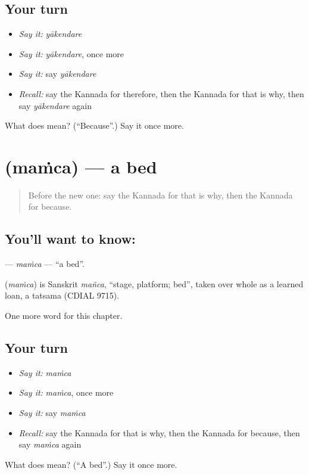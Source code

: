 \subsection*{Your turn}
\begin{itemize}
\raggedright
  \item \emph{Say it:} \emph{yākendare}
  \item \emph{Say it:} \emph{yākendare}, once more
  \item \emph{Say it:} say \emph{yākendare}
  \item \emph{Recall:} say the Kannada for therefore, then the Kannada for that is why, then say \emph{yākendare} again
\end{itemize}

\begin{tcolorbox}[breakable,colback=teal!4,colframe=teal!35!black,title={Before you move on}]
What does  mean? (\textquotedblleft{}Because\textquotedblright{}.) Say it once more.
\end{tcolorbox}
\section[\texorpdfstring{\kn{ಮಂಚ} (maṁca)}{ಮಂಚ (maṁca)}]{ (maṁca) — a bed}

\label{lesson:KA-C115-mamca}



\begin{quote}
Before the new one: say the Kannada for that is why, then the Kannada for because.
\end{quote}

\subsection*{You'll want to know: }
\textbf{} — \emph{maṁca} — \textquotedblleft{}a bed\textquotedblright{}.

\begin{cousinweb}
\textbf{} (\emph{maṁca}) is Sanskrit \emph{mañca}, \textquotedblleft{}stage, platform; bed\textquotedblright{}, taken over whole as a learned loan, a tatsama (CDIAL 9715).
\end{cousinweb}

\begin{grammarlens}[title={What you've built}]
One more word for this chapter.
\end{grammarlens}

\subsection*{Your turn}
\begin{itemize}
\raggedright
  \item \emph{Say it:} \emph{maṁca}
  \item \emph{Say it:} \emph{maṁca}, once more
  \item \emph{Say it:} say \emph{maṁca}
  \item \emph{Recall:} say the Kannada for that is why, then the Kannada for because, then say \emph{maṁca} again
\end{itemize}

\begin{tcolorbox}[breakable,colback=teal!4,colframe=teal!35!black,title={Before you move on}]
What does  mean? (\textquotedblleft{}A bed\textquotedblright{}.) Say it once more.
\end{tcolorbox}
